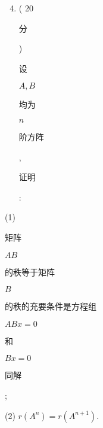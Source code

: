 \documentclass[10pt]{article}
\begin{document}
\begin{enumerate}
  \setcounter{enumi}{3}
  \item ( 20 \begin{CJK}{UTF8}{mj}分\end{CJK}) \begin{CJK}{UTF8}{mj}设\end{CJK} $A, B$ \begin{CJK}{UTF8}{mj}均为\end{CJK} $n$ \begin{CJK}{UTF8}{mj}阶方阵\end{CJK}, \begin{CJK}{UTF8}{mj}证明\end{CJK}:
\end{enumerate}
(1) \begin{CJK}{UTF8}{mj}矩阵\end{CJK} $A B$ \begin{CJK}{UTF8}{mj}的秩等于矩阵\end{CJK} $B$ \begin{CJK}{UTF8}{mj}的秩的充要条件是方程组\end{CJK} $A B x=0$ \begin{CJK}{UTF8}{mj}和\end{CJK} $B x=0$ \begin{CJK}{UTF8}{mj}同解\end{CJK};

(2) $r\left(A^{n}\right)=r\left(A^{n+1}\right)$.
\end{document}
